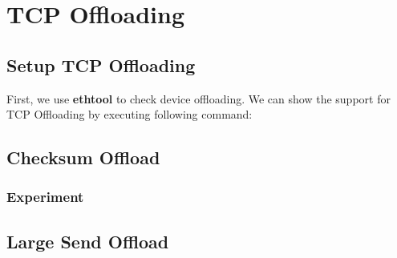 \documentclass[bsc,frontabs,twoside,singlespacing,parskip,deptreport]{infthesis}     %
\begin{document}
\chapter{TCP Offloading}

\section{Setup TCP Offloading}
First, we use \textbf{ethtool} to check device offloading. We can show the support for TCP Offloading by executing following command: 







\section{Checksum Offload}

\subsection{Experiment}


\section{Large Send Offload}








\end{document}

